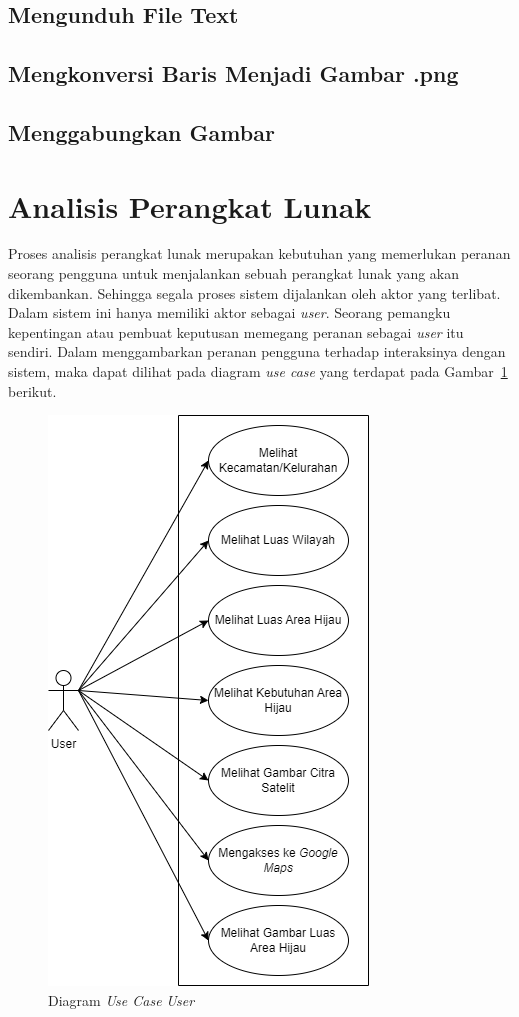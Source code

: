 \subsection{Mengunduh File Text}


\subsection{Mengkonversi Baris Menjadi Gambar .png}
\subsection{Menggabungkan Gambar}

\section{Analisis Perangkat Lunak}
Proses analisis perangkat lunak merupakan kebutuhan yang memerlukan peranan seorang pengguna untuk menjalankan sebuah perangkat lunak yang akan dikembankan. Sehingga segala proses sistem dijalankan oleh aktor yang terlibat. Dalam sistem ini hanya memiliki aktor sebagai \textit{user}. Seorang pemangku kepentingan atau pembuat keputusan memegang peranan sebagai \textit{user} itu sendiri. Dalam menggambarkan peranan pengguna terhadap interaksinya dengan sistem, maka dapat dilihat pada diagram \textit{use case} yang terdapat pada Gambar~\ref{fig:useCaseUser} berikut.

\begin{figure}[H]
	\centering
	\includegraphics[scale=0.5]{Gambar/UseCaseUser.png}
	\caption[Diagram \textit{Use Case} \textit{User}]{Diagram \textit{Use Case} \textit{User}}
	\label{fig:useCaseUser}
\end{figure}

